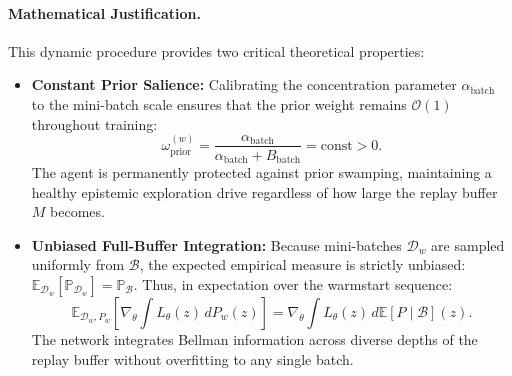 \documentclass[10pt]{article}
\begin{document}
\paragraph{Mathematical Justification.}
This dynamic procedure provides two critical theoretical properties:
\begin{itemize}
    \item \textbf{Constant Prior Salience:} Calibrating the concentration parameter $\alpha_{\text{batch}}$ to the mini-batch scale ensures that the prior weight remains $\mathcal{O}(1)$ throughout training:
    \begin{equation}
    \omega_{\text{prior}}^{(w)} = \frac{\alpha_{\text{batch}}}{\alpha_{\text{batch}} + B_{\text{batch}}} = \text{const} > 0.
    \end{equation}
    The agent is permanently protected against prior swamping, maintaining a healthy epistemic exploration drive regardless of how large the replay buffer $M$ becomes.
    \item \textbf{Unbiased Full-Buffer Integration:} Because mini-batches $\mathcal{D}_w$ are sampled uniformly from $\mathcal{B}$, the expected empirical measure is strictly unbiased: $\mathbb{E}_{\mathcal{D}_w}[\mathbb{P}_{\mathcal{D}_w}] = \mathbb{P}_{\mathcal{B}}$. Thus, in expectation over the warmstart sequence:
    \begin{equation}
    \mathbb{E}_{\mathcal{D}_w, P_w}\left[\nabla_\theta \int L_\theta(z) \, dP_w(z)\right] = \nabla_\theta \int L_\theta(z) \, d\mathbb{E}[P \mid \mathcal{B}](z).
    \end{equation}
    The network integrates Bellman information across diverse depths of the replay buffer without overfitting to any single batch.
\end{itemize}
\end{document}
